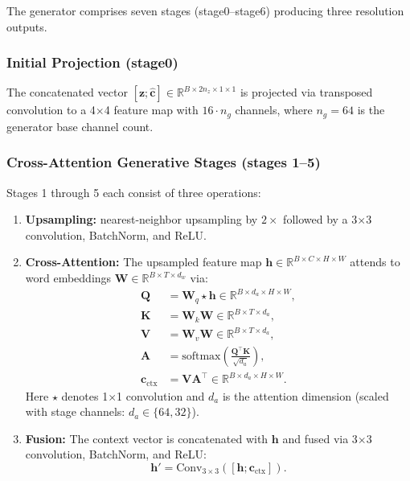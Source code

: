 \documentclass[conference]{IEEEtran}
\begin{document}
The generator comprises seven stages (stage0--stage6) producing three resolution outputs.

\subsubsection{Initial Projection (stage0)}
The concatenated vector $[\mathbf{z}; \hat{\mathbf{c}}] \in \mathbb{R}^{B \times 2n_z \times 1 \times 1}$ is projected via transposed convolution to a 4$\times$4 feature map with $16 \cdot n_g$ channels, where $n_g=64$ is the generator base channel count.

\subsubsection{Cross-Attention Generative Stages (stages 1--5)}
Stages 1 through 5 each consist of three operations:
\begin{enumerate}
    \item \textbf{Upsampling:} nearest-neighbor upsampling by $2\times$ followed by a 3$\times$3 convolution, BatchNorm, and ReLU.
    \item \textbf{Cross-Attention:} The upsampled feature map $\mathbf{h} \in \mathbb{R}^{B \times C \times H \times W}$ attends to word embeddings $\mathbf{W} \in \mathbb{R}^{B \times T \times d_w}$ via:
    \begin{align}
        \mathbf{Q} &= \mathbf{W}_q \star \mathbf{h} \in \mathbb{R}^{B \times d_a \times H \times W}, \\
        \mathbf{K} &= \mathbf{W}_k \mathbf{W} \in \mathbb{R}^{B \times T \times d_a}, \\
        \mathbf{V} &= \mathbf{W}_v \mathbf{W} \in \mathbb{R}^{B \times T \times d_a}, \\
        \mathbf{A} &= \text{softmax}\left( \frac{\mathbf{Q}^\top \mathbf{K}}{\sqrt{d_a}} \right), \\
        \mathbf{c}_{\text{ctx}} &= \mathbf{V} \mathbf{A}^\top \in \mathbb{R}^{B \times d_a \times H \times W}.
    \end{align}
    Here $\star$ denotes 1$\times$1 convolution and $d_a$ is the attention dimension (scaled with stage channels: $d_a \in \{64, 32\}$).
    \item \textbf{Fusion:} The context vector is concatenated with $\mathbf{h}$ and fused via 3$\times$3 convolution, BatchNorm, and ReLU:
    \begin{equation}
        \mathbf{h}' = \text{Conv}_{3\times3}\left( [\mathbf{h}; \mathbf{c}_{\text{ctx}}] \right).
    \end{equation}
\end{enumerate}
\end{document}
